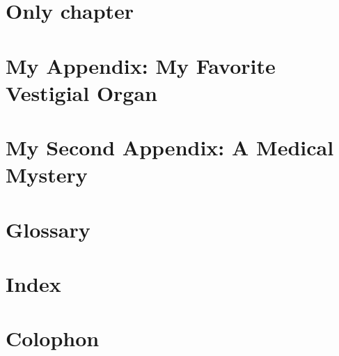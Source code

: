 \documentclass[capstoc,capschap]{rpisudiss}
\begin{document}
\frontmatter

\tableofcontents

\mainmatter %

\chapter{Only chapter}

\appendix

\chapter{My Appendix: My Favorite Vestigial Organ}
\blindtext

\chapter{My Second Appendix: A Medical Mystery}
\blindtext

\backmatter

\chapter{Glossary}
\chapter{Index}
\chapter{Colophon}
\end{document}

